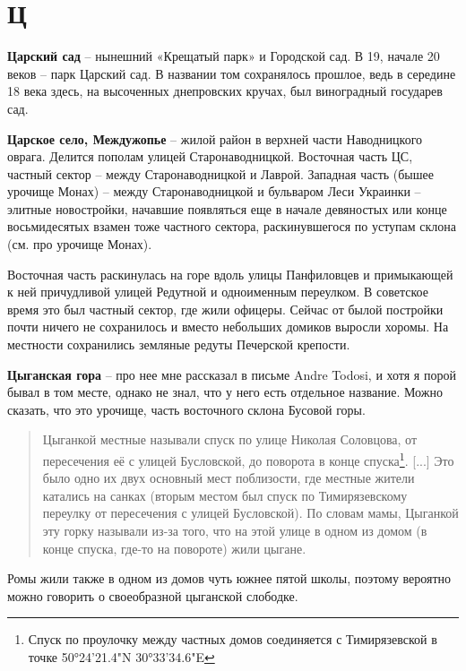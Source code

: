 \chapter*{Ц}

\textbf{Царский сад} – нынешний «Крещатый парк» и Городской сад. В 19, начале 20 веков – парк Царский сад. В названии том сохранялось прошлое, ведь в середине 18 века здесь, на высоченных днепровских кручах, был виноградный государев сад.\\

\medskip

\textbf{Царское село, Междужопье} – жилой район в верхней части Наводницкого оврага. Делится пополам улицей Старонаводницкой. Восточная часть ЦС, частный сектор – между Старонаводницкой и Лаврой. Западная часть (бышее урочище Монах) – между Старонаводницкой и бульваром Леси Украинки – элитные новостройки, начавшие появляться еще в начале девяностых или конце восьмидесятых взамен тоже частного сектора, раскинувшегося по уступам склона (см. про урочище Монах).

Восточная часть раскинулась на горе вдоль улицы Панфиловцев и примыкающей к ней причудливой улицей Редутной и одноименным переулком. В советское время это был частный сектор, где жили офицеры. Сейчас от былой постройки почти ничего не сохранилось и вместо небольших домиков выросли хоромы. На местности сохранились земляные редуты Печерской крепости.\\

\medskip

\textbf{Цыганская гора} – про нее мне рассказал в письме Andre Todosi, и хотя я порой бывал в том месте, однако не знал, что у него есть отдельное название. Можно сказать, что это урочище, часть восточного склона Бусовой горы.

\begin{quotation}
Цыганкой местные называли спуск по улице Николая Соловцова, от пересечения её с улицей Бусловской, до поворота в конце спуска\footnote{Спуск по проулочку между частных домов соединяется с Тимирязевской в точке 50°24'21.4"N 30°33'34.6"E}. [...] Это было одно их двух основный мест поблизости, где местные жители катались на санках (вторым
местом был спуск по Тимирязевскому переулку от пересечения с улицей Бусловской). По словам мамы, Цыганкой эту горку называли из-за того, что на этой улице в одном из домом (в конце спуска, где-то на повороте) жили цыгане.
\end{quotation}

Ромы жили также в одном из домов чуть южнее пятой школы, поэтому вероятно можно говорить о своеобразной цыганской слободке.\\


